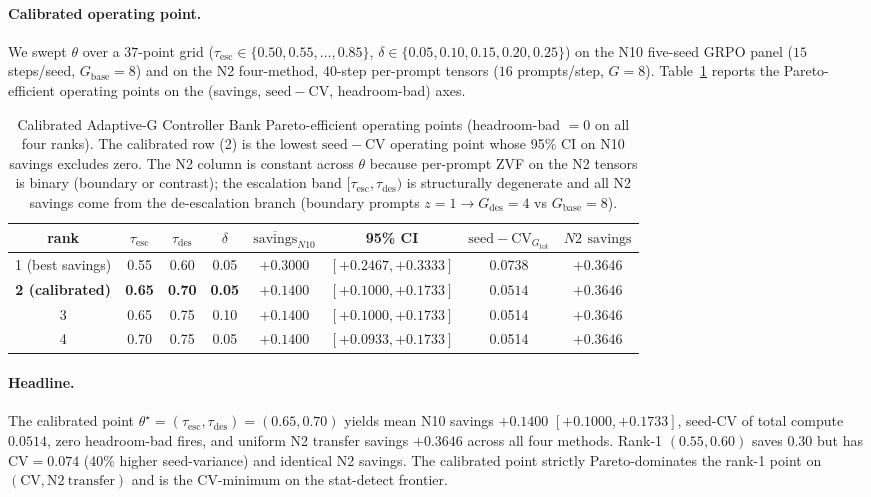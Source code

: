 \paragraph{Calibrated operating point.}
We swept $\theta$ over a $37$-point grid
($\tau_{\mathrm{esc}}\in\{0.50,0.55,\ldots,0.85\}$,
$\delta\in\{0.05,0.10,0.15,0.20,0.25\}$) on the N10 five-seed
GRPO panel ($15$ steps/seed, $G_{\mathrm{base}}{=}8$) and on the
N2 four-method, $40$-step per-prompt tensors
($16$ prompts/step, $G{=}8$). Table~\ref{tab:p7-unified-bank}
reports the Pareto-efficient operating points on the
(savings, $\mathrm{seed{-}CV}$, headroom-bad) axes.

\begin{table}[t]
\centering
\small
\begin{tabular}{cccccccc}
\toprule
rank & $\tau_{\mathrm{esc}}$ & $\tau_{\mathrm{des}}$ & $\delta$ &
$\overline{\mathrm{savings}}_{N10}$ & 95\% CI &
$\mathrm{seed{-}CV}_{G_{\mathrm{tot}}}$ & $N2$ $\mathrm{savings}$ \\
\midrule
1 (best savings) & 0.55 & 0.60 & 0.05 & $+0.3000$ & $[+0.2467, +0.3333]$ & 0.0738 & $+0.3646$ \\
\textbf{2 (calibrated)} & \textbf{0.65} & \textbf{0.70} & \textbf{0.05} & $\mathbf{+0.1400}$ & $\mathbf{[+0.1000, +0.1733]}$ & $\mathbf{0.0514}$ & $\mathbf{+0.3646}$ \\
3 & 0.65 & 0.75 & 0.10 & $+0.1400$ & $[+0.1000, +0.1733]$ & 0.0514 & $+0.3646$ \\
4 & 0.70 & 0.75 & 0.05 & $+0.1400$ & $[+0.0933, +0.1733]$ & 0.0514 & $+0.3646$ \\
\bottomrule
\end{tabular}
\caption{Calibrated Adaptive-G Controller Bank Pareto-efficient
operating points (headroom-bad $= 0$ on all four ranks).
The calibrated row (2) is the lowest $\mathrm{seed{-}CV}$ operating
point whose 95\% CI on N10 savings excludes zero. The N2 column
is constant across $\theta$ because per-prompt ZVF on the N2
tensors is binary (boundary or contrast); the escalation band
$[\tau_{\mathrm{esc}},\tau_{\mathrm{des}})$ is structurally
degenerate and all N2 savings come from the de-escalation branch
(boundary prompts $z{=}1 \to G_{\mathrm{des}}{=}4$ vs $G_{\mathrm{base}}{=}8$).
\label{tab:p7-unified-bank}}
\end{table}

\paragraph{Headline.} The calibrated point
$\theta^\star = (\tau_{\mathrm{esc}}, \tau_{\mathrm{des}}) = (0.65, 0.70)$
yields mean N10 savings $+0.1400$
$[+0.1000, +0.1733]$, seed-CV of total compute $0.0514$,
zero headroom-bad fires, and uniform N2 transfer savings $+0.3646$
across all four methods. Rank-1 $(0.55, 0.60)$ saves $0.30$ but has
$\mathrm{CV}=0.074$ (40\% higher seed-variance) and identical N2
savings. The calibrated point strictly Pareto-dominates the
rank-1 point on $(\mathrm{CV}, \mathrm{N2\ transfer})$ and is the
$\mathrm{CV}$-minimum on the stat-detect frontier.

